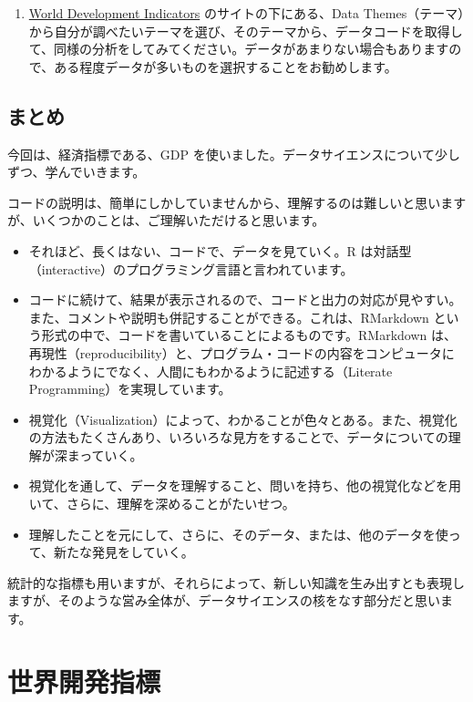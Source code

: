 \documentclass[
  xelatex, ja=standard]{bxjsbook}
\providecommand{\tightlist}{%
  \setlength{\itemsep}{0pt}\setlength{\parskip}{0pt}}
\theoremstyle{definition}
\theoremstyle{definition}
\theoremstyle{definition}
\theoremstyle{definition}
\theoremstyle{remark}
\begin{document}
\begin{enumerate}
\def\labelenumi{\arabic{enumi}.}
\setcounter{enumi}{1}
\tightlist
\item
  \href{https://datatopics.worldbank.org/world-development-indicators/}{World Development Indicators} のサイトの下にある、Data Themes（テーマ）から自分が調べたいテーマを選び、そのテーマから、データコードを取得して、同様の分析をしてみてください。データがあまりない場合もありますので、ある程度データが多いものを選択することをお勧めします。
\end{enumerate}

\hypertarget{ux307eux3068ux3081}{%
\section{まとめ}\label{ux307eux3068ux3081}}

今回は、経済指標である、GDP を使いました。データサイエンスについて少しずつ、学んでいきます。

コードの説明は、簡単にしかしていませんから、理解するのは難しいと思いますが、いくつかのことは、ご理解いただけると思います。

\begin{itemize}
\item
  それほど、長くはない、コードで、データを見ていく。R は対話型（interactive）のプログラミング言語と言われています。
\item
  コードに続けて、結果が表示されるので、コードと出力の対応が見やすい。また、コメントや説明も併記することができる。これは、RMarkdown という形式の中で、コードを書いていることによるものです。RMarkdown は、再現性（reproducibility）と、プログラム・コードの内容をコンピュータにわかるようにでなく、人間にもわかるように記述する（Literate Programming）を実現しています。
\item
  視覚化（Visualization）によって、わかることが色々とある。また、視覚化の方法もたくさんあり、いろいろな見方をすることで、データについての理解が深まっていく。
\item
  視覚化を通して、データを理解すること、問いを持ち、他の視覚化などを用いて、さらに、理解を深めることがたいせつ。
\item
  理解したことを元にして、さらに、そのデータ、または、他のデータを使って、新たな発見をしていく。
\end{itemize}

統計的な指標も用いますが、それらによって、新しい知識を生み出すとも表現しますが、そのような営み全体が、データサイエンスの核をなす部分だと思います。

\hypertarget{wdi-site}{%
\chapter{世界開発指標}\label{wdi-site}}
\end{document}
